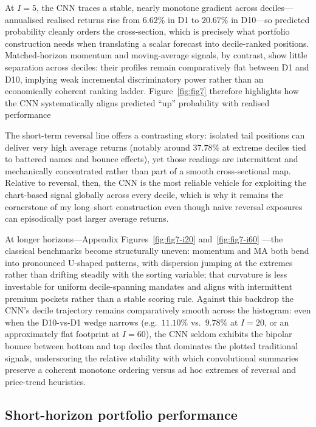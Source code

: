 \documentclass{article}
\begin{document}
At $I=5$, the CNN traces a stable, nearly monotone gradient across
deciles---annualised realised returns rise from $6.62\%$ in D1 to
$20.67\%$ in D10---so predicted probability cleanly orders the cross-section,
which is precisely what portfolio construction needs when translating a scalar
forecast into decile-ranked positions. Matched-horizon momentum and
moving-average signals, by contrast, show little separation across deciles:
their profiles remain comparatively flat between D1 and D10, implying weak
incremental discriminatory power rather than an economically coherent
ranking ladder. Figure~\ref{fig:fig7} therefore highlights how the CNN
systematically aligns predicted ``up'' probability with realised performance

The short-term reversal line offers a contrasting story: isolated tail
positions can deliver very high average returns (notably around
$37.78\%$ at extreme deciles tied to battered names and bounce effects), yet
those readings are intermittent and mechanically concentrated rather than part
of a smooth cross-sectional map. Relative to reversal, then, the CNN is the
most reliable vehicle for exploiting the chart-based signal globally across
every decile, which is why it remains the cornerstone of my long--short
construction even though naive reversal exposures can episodically post larger
average returns.

At longer horizons---Appendix Figures~\ref{fig:fig7-i20} and~\ref{fig:fig7-i60}
---the classical benchmarks become structurally uneven: momentum and MA both
bend into pronounced U-shaped patterns, with dispersion jumping at the extremes
rather than drifting steadily with the sorting variable; that curvature is less
investable for uniform decile-spanning mandates and aligns with intermittent
premium pockets rather than a stable scoring rule. Against this backdrop the
CNN's decile trajectory remains comparatively smooth across the histogram: even
when the D10-vs-D1 wedge narrows (e.g.\ $11.10\%$ vs.\ $9.78\%$ at $I=20$, or an
approximately flat footprint at $I=60$), the CNN seldom exhibits the bipolar
bounce between bottom and top deciles that dominates the plotted traditional
signals, underscoring the relative stability with which convolutional summaries
preserve a coherent monotone ordering versus ad hoc extremes of reversal and
price-trend heuristics.


\subsection{Short-horizon portfolio performance}
\end{document}
